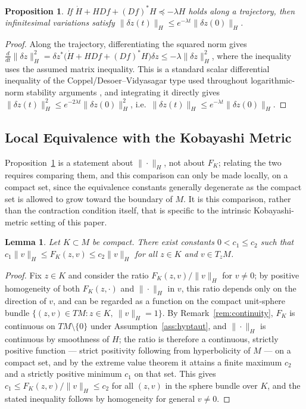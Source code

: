 \documentclass[preprint,12pt,authoryear]{elsarticle}
\newtheorem{lemma}{Lemma} %
\newtheorem{proof}{Proof}
\newtheorem{proposition}{Proposition}
\begin{document}
\begin{proposition}
\label{prop:hermitiandecay}
If $\dot H+HDf+(Df)^*H\preceq-\lambda H$ holds along a trajectory, then infinitesimal variations satisfy $\|\delta z(t)\|_H\le e^{-\lambda t}\|\delta z(0)\|_H$.
\end{proposition}

\begin{proof}
Along the trajectory, differentiating the squared norm gives $\tfrac{d}{dt}\|\delta z\|_H^2=\delta z^*\big(\dot H+HDf+(Df)^*H\big)\delta z\le-\lambda\|\delta z\|_H^2$, where the inequality uses the assumed matrix inequality. This is a standard scalar differential inequality of the Coppel/Desoer--Vidyasagar type used throughout logarithmic-norm stability arguments \cite{desoer1975feedback}, and integrating it directly gives $\|\delta z(t)\|_H^2\le e^{-2\lambda t}\|\delta z(0)\|_H^2$, i.e.\ $\|\delta z(t)\|_H\le e^{-\lambda t}\|\delta z(0)\|_H$.
\end{proof}

\subsection{Local Equivalence with the Kobayashi Metric}

Proposition~\ref{prop:hermitiandecay} is a statement about $\|\cdot\|_H$, not about $F_K$; relating the two requires comparing them, and this comparison can only be made locally, on a compact set, since the equivalence constants generally degenerate as the compact set is allowed to grow toward the boundary of $M$. It is this comparison, rather than the contraction condition itself, that is specific to the intrinsic Kobayashi-metric setting of this paper.

\begin{lemma}
\label{lem:equivalence}
Let $K\subset M$ be compact. There exist constants $0<c_1\le c_2$ such that $c_1\|v\|_H\le F_K(z,v)\le c_2\|v\|_H$ for all $z\in K$ and $v\in T_zM$.
\end{lemma}

\begin{proof}
Fix $z\in K$ and consider the ratio $F_K(z,v)/\|v\|_H$ for $v\ne0$; by positive homogeneity of both $F_K(z,\cdot)$ and $\|\cdot\|_H$ in $v$, this ratio depends only on the direction of $v$, and can be regarded as a function on the compact unit-sphere bundle $\{(z,v)\in TM:z\in K,\ \|v\|_H=1\}$. By Remark~\ref{rem:continuity}, $F_K$ is continuous on $TM\setminus\{0\}$ under Assumption~\ref{ass:hyptaut}, and $\|\cdot\|_H$ is continuous by smoothness of $H$; the ratio is therefore a continuous, strictly positive function — strict positivity following from hyperbolicity of $M$ — on a compact set, and by the extreme value theorem it attains a finite maximum $c_2$ and a strictly positive minimum $c_1$ on that set. This gives $c_1\le F_K(z,v)/\|v\|_H\le c_2$ for all $(z,v)$ in the sphere bundle over $K$, and the stated inequality follows by homogeneity for general $v\ne0$.
\end{proof}
\end{document}
